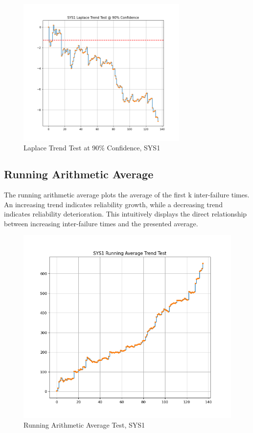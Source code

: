 \documentclass{article}
\begin{document}
\begin{figure}[h!]
\centering
\includegraphics[width=0.75\textwidth]{lapplot1.png}
\caption{Laplace Trend Test at 90\% Confidence, SYS1}
\label{fig:lapplot}
\end{figure}



\newpage
\subsection{Running Arithmetic Average}
The running arithmetic average plots the average of the first k inter-failure times. An increasing trend indicates reliability growth, while a decreasing trend indicates reliability deterioration. This intuitively displays the direct relationship between increasing inter-failure times and the presented average.



\begin{figure}[h!]
\centering
\includegraphics[width=\textwidth]{avgplot1.png}
\caption{Running Arithmetic Average Test, SYS1}
\label{fig:avgplot}
\end{figure}
\end{document}
